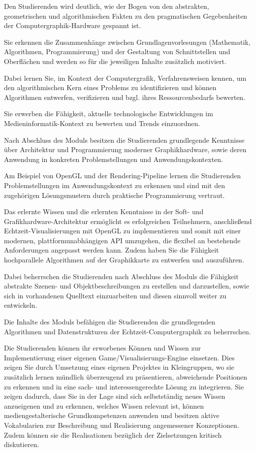 Den Studierenden wird deutlich, wie der Bogen von den abstrakten,
geometrischen und algorithmischen Fakten zu den pragmatischen
Gegebenheiten der Computergraphik-Hardware gespannt ist.

Sie erkennen die Zusammenhänge zwischen Grundlagenvorlesungen
(Mathematik, Algorithmen, Programmierung) und der Gestaltung von
Schnittstellen und Oberflächen und werden so für die jeweiligen Inhalte
zusätzlich motiviert.

Dabei lernen Sie, im Kontext der Computergrafik, Verfahrensweisen
kennen, um den algorithmischen Kern eines Problems zu identifizieren und
können Algorithmen entwerfen, verifizieren und bzgl. ihres
Ressourcenbedarfs bewerten.

Sie erwerben die Fähigkeit, aktuelle technologische Entwicklungen im
Medieninformatik-Kontext zu bewerten und Trends einzuordnen.

Nach Abschluss des Moduls besitzen die Studierenden grundlegende
Kenntnisse über Architektur und Programmierung moderner Graphikhardware,
sowie deren Anwendung in konkreten Problemstellungen und
Anwendungskontexten.

Am Beispiel von OpenGL und der Rendering-Pipeline lernen die
Studierenden Problemstellungen im Anwendungskontext zu erkennen und sind
mit den zugehörigen Lösungsmustern durch praktische Programmierung
vertraut.

Das erlernte Wissen und die erlernten Kenntnisse in der Soft- und
Grafikhardware-Architektur ermöglicht es erfolgreichen Teilnehmern,
anschließend Echtzeit-Visualisierungen mit OpenGL zu implementieren und
somit mit einer modernen, plattformunabhängigen API umzugehen, die
flexibel an bestehende Anforderungen angepasst werden kann. Zudem haben
Sie die Fähigkeit hochparallele Algorithmen auf der Graphikkarte zu
entwerfen und auszuführen.

Dabei beherrschen die Studierenden nach Abschluss des Moduls die
Fähigkeit abstrakte Szenen- und Objektbeschreibungen zu erstellen und
darzustellen, sowie sich in vorhandenen Quelltext einzuarbeiten und
diesen sinnvoll weiter zu entwickeln.

Die Inhalte des Moduls befähigen die Studierenden die grundlegenden
Algorithmen und Datenstrukturen der Echtzeit-Computergraphik zu
beherrschen.

Die Studierenden können ihr erworbenes Können und Wissen zur
Implementierung einer eigenen Game/Visualisierungs-Engine einsetzen.
Dies zeigen Sie durch Umsetzung eines eigenen Projektes in Kleingruppen,
wo sie zusätzlich lernen mündlich überzeugend zu präsentieren,
abweichende Positionen zu erkennen und in eine sach- und
interessengerechte Lösung zu integrieren. Sie zeigen dadurch, dass Sie
in der Lage sind sich selbstständig neues Wissen anzueigenen und zu
erkennen, welches Wissen relevant ist, können mediengestalterische
Grundkompetenzen anwenden und besitzen aktive Vokabularien zur
Beschreibung und Realisierung angemessener Konzeptionen. Zudem können
sie die Realisationen bezüglich der Zielsetzungen kritisch diskutieren.

